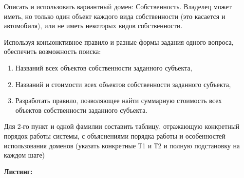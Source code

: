 \documentclass[12pt, a4paper]{extarticle}
\begin{document}
	Описать  и использовать вариантный домен: Собственность. Владелец может иметь, но только один объект каждого вида собственности (это касается и автомобиля), или не иметь некоторых видов собственности. 
	
	\hfill
	
	Используя конъюнктивное правило и разные формы задания одного вопроса, обеспечить возможность поиска:
	\begin{enumerate}
		\item Названий всех объектов собственности заданного субъекта,
		\item Названий и стоимости всех объектов собственности заданного субъекта,
		\item Разработать правило, позволяющее найти суммарную стоимость всех объектов собственности заданного субъекта.
	\end{enumerate}
	
	\hfill
	
	Для 2-го пункт и одной фамилии составить таблицу, отражающую конкретный порядок работы системы, с объяснениями порядка работы и особенностей использования доменов (указать конкретные Т1 и Т2 и полную подстановку на каждом шаге)
	
	
	\newpage
	
	\textbf{Листинг:}
	
\end{document}
